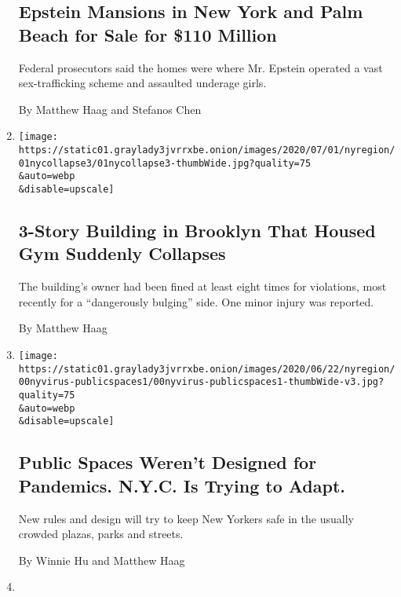 \begin{enumerate}
{  \subsection{Epstein Mansions in New York and Palm Beach for Sale for
  \$110
  Million}\label{epstein-mansions-in-new-york-and-palm-beach-for-sale-for-110-million}}

  Federal prosecutors said the homes were where Mr. Epstein operated a
  vast sex-trafficking scheme and assaulted underage girls.

  By Matthew Haag and Stefanos Chen
\item
  \href{/2020/07/01/nyregion/brooklyn-building-collapse.html}{}

  \texttt{[image: https://static01.graylady3jvrrxbe.onion/images/2020/07/01/nyregion/01nycollapse3/01nycollapse3-thumbWide.jpg?quality=75\\\&auto=webp\\\&disable=upscale]}

  \hypertarget{3-story-building-in-brooklyn-that-housed-gym-suddenly-collapses}{%
  \subsection{3-Story Building in Brooklyn That Housed Gym Suddenly
  Collapses}\label{3-story-building-in-brooklyn-that-housed-gym-suddenly-collapses}}

  The building's owner had been fined at least eight times for
  violations, most recently for a ``dangerously bulging'' side. One
  minor injury was reported.

  By Matthew Haag
\item
  \href{/2020/06/29/nyregion/nyc-parks-playgrounds-plazas-coronavirus.html}{}

  \texttt{[image: https://static01.graylady3jvrrxbe.onion/images/2020/06/22/nyregion/00nyvirus-publicspaces1/00nyvirus-publicspaces1-thumbWide-v3.jpg?quality=75\\\&auto=webp\\\&disable=upscale]}

  \hypertarget{public-spaces-werent-designed-for-pandemics-nyc-is-trying-to-adapt}{%
  \subsection{Public Spaces Weren't Designed for Pandemics. N.Y.C. Is
  Trying to
  Adapt.}\label{public-spaces-werent-designed-for-pandemics-nyc-is-trying-to-adapt}}

  New rules and design will try to keep New Yorkers safe in the usually
  crowded plazas, parks and streets.

  By Winnie Hu and Matthew Haag
\item
  \href{/2020/06/26/nyregion/nyc-reopening-sunset-park.html}{}


\end{enumerate}
